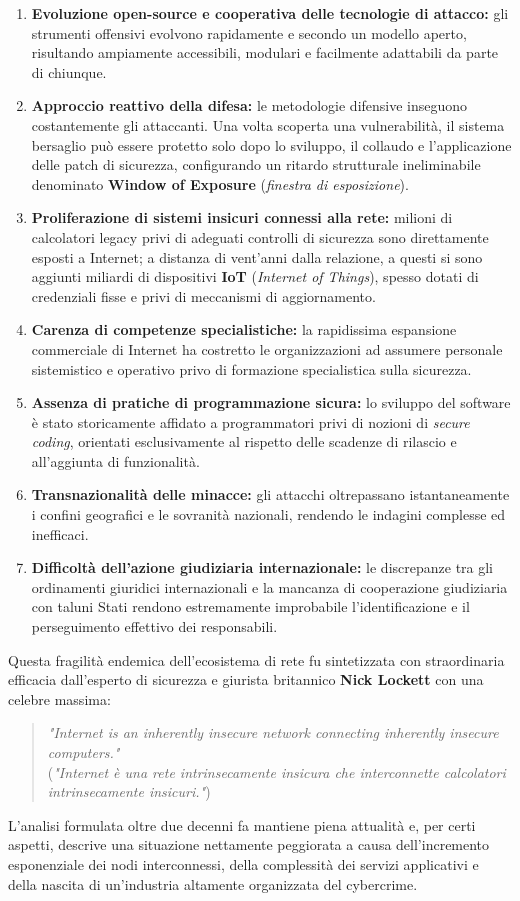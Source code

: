 \documentclass[../../main.tex]{subfiles}
\begin{document}
\begin{enumerate}
    \item \textbf{Evoluzione open-source e cooperativa delle tecnologie di attacco:} gli strumenti offensivi evolvono rapidamente e secondo un modello aperto, risultando ampiamente accessibili, modulari e facilmente adattabili da parte di chiunque.
    \item \textbf{Approccio reattivo della difesa:} le metodologie difensive inseguono costantemente gli attaccanti. Una volta scoperta una vulnerabilità, il sistema bersaglio può essere protetto solo dopo lo sviluppo, il collaudo e l'applicazione delle patch di sicurezza, configurando un ritardo strutturale ineliminabile denominato \textbf{Window of Exposure} (\textit{finestra di esposizione}).
    \item \textbf{Proliferazione di sistemi insicuri connessi alla rete:} milioni di calcolatori legacy privi di adeguati controlli di sicurezza sono direttamente esposti a Internet; a distanza di vent'anni dalla relazione, a questi si sono aggiunti miliardi di dispositivi \textbf{IoT} (\textit{Internet of Things}), spesso dotati di credenziali fisse e privi di meccanismi di aggiornamento.
    \item \textbf{Carenza di competenze specialistiche:} la rapidissima espansione commerciale di Internet ha costretto le organizzazioni ad assumere personale sistemistico e operativo privo di formazione specialistica sulla sicurezza.
    \item \textbf{Assenza di pratiche di programmazione sicura:} lo sviluppo del software è stato storicamente affidato a programmatori privi di nozioni di \textit{secure coding}, orientati esclusivamente al rispetto delle scadenze di rilascio e all'aggiunta di funzionalità.
    \item \textbf{Transnazionalità delle minacce:} gli attacchi oltrepassano istantaneamente i confini geografici e le sovranità nazionali, rendendo le indagini complesse ed inefficaci.
    \item \textbf{Difficoltà dell'azione giudiziaria internazionale:} le discrepanze tra gli ordinamenti giuridici internazionali e la mancanza di cooperazione giudiziaria con taluni Stati rendono estremamente improbabile l'identificazione e il perseguimento effettivo dei responsabili.
\end{enumerate}

Questa fragilità endemica dell'ecosistema di rete fu sintetizzata con straordinaria efficacia dall'esperto di sicurezza e giurista britannico \textbf{Nick Lockett} con una celebre massima:
\begin{quote}
\textit{"Internet is an inherently insecure network connecting inherently insecure computers."} \\
(\textit{"Internet è una rete intrinsecamente insicura che interconnette calcolatori intrinsecamente insicuri."})
\end{quote}
L'analisi formulata oltre due decenni fa mantiene piena attualità e, per certi aspetti, descrive una situazione nettamente peggiorata a causa dell'incremento esponenziale dei nodi interconnessi, della complessità dei servizi applicativi e della nascita di un'industria altamente organizzata del cybercrime.
\end{document}
